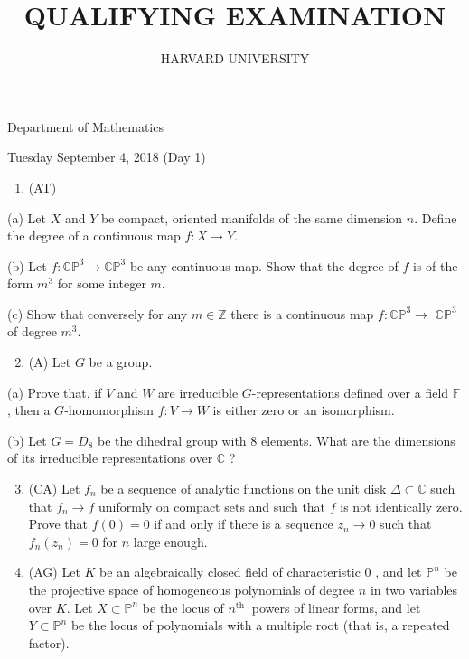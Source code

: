 \documentclass[10pt]{article}
\title{QUALIFYING EXAMINATION }
\author{HARVARD UNIVERSITY}
\date{}
\begin{document}
\maketitle
Department of Mathematics

Tuesday September 4, 2018 (Day 1)

\begin{enumerate}
  \item (AT)
\end{enumerate}

(a) Let $X$ and $Y$ be compact, oriented manifolds of the same dimension $n$. Define the degree of a continuous map $f: X \rightarrow Y$.

(b) Let $f: \mathbb{C P}^{3} \rightarrow \mathbb{C P}^{3}$ be any continuous map. Show that the degree of $f$ is of the form $m^{3}$ for some integer $m$.

(c) Show that conversely for any $m \in \mathbb{Z}$ there is a continuous map $f: \mathbb{C P}^{3} \rightarrow$ $\mathbb{C P}^{3}$ of degree $m^{3}$.

\begin{enumerate}
  \setcounter{enumi}{1}
  \item (A) Let $G$ be a group.
\end{enumerate}

(a) Prove that, if $V$ and $W$ are irreducible $G$-representations defined over a field $\mathbb{F}$, then a $G$-homomorphism $f: V \rightarrow W$ is either zero or an isomorphism.

(b) Let $G=D_{8}$ be the dihedral group with 8 elements. What are the dimensions of its irreducible representations over $\mathbb{C}$ ?

\begin{enumerate}
  \setcounter{enumi}{2}
  \item (CA) Let $f_{n}$ be a sequence of analytic functions on the unit disk $\Delta \subset \mathbb{C}$ such that $f_{n} \rightarrow f$ uniformly on compact sets and such that $f$ is not identically zero. Prove that $f(0)=0$ if and only if there is a sequence $z_{n} \rightarrow 0$ such that $f_{n}\left(z_{n}\right)=0$ for $n$ large enough.

  \item (AG) Let $K$ be an algebraically closed field of characteristic 0 , and let $\mathbb{P}^{n}$ be the projective space of homogeneous polynomials of degree $n$ in two variables over $K$. Let $X \subset \mathbb{P}^{n}$ be the locus of $n^{\text {th }}$ powers of linear forms, and let $Y \subset \mathbb{P}^{n}$ be the locus of polynomials with a multiple root (that is, a repeated factor).

\end{enumerate}
\end{document}
